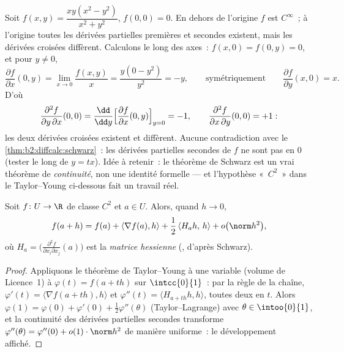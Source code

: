 \begin{example}\label{ex:b2:diffcalc:peano}
Soit $f(x, y) = \dfrac{xy(x^2 - y^2)}{x^2 + y^2}$, $f(0,0) = 0$.
En dehors de l'origine $f$ est $C^\infty$~; à l'origine toutes les
dérivées partielles premières et secondes existent, mais les dérivées
croisées diffèrent. Calculons le long des axes~: $f(x, 0) = f(0, y) =
0$, et pour $y \neq 0$,
\[
\frac{\partial f}{\partial x}(0, y)
= \lim_{x\to0}\frac{f(x,y)}{x}
= \frac{y(0 - y^2)}{y^2} = -y ,
\qquad\text{symétriquement}\qquad
\frac{\partial f}{\partial y}(x, 0) = x .
\]
D'où
\[
\frac{\partial^2 f}{\partial y\,\partial x}(0,0)
= \frac{\dd}{\dd y}\Bigl[\frac{\partial f}{\partial
x}(0,y)\Bigr]_{y=0} = -1,
\qquad
\frac{\partial^2 f}{\partial x\,\partial y}(0,0) = +1 :
\]
les deux dérivées croisées existent et diffèrent. Aucune
contradiction avec le \cref{thm:b2:diffcalc:schwarz}~: les dérivées
partielles secondes de $f$ ne sont pas  en $0$ (tester le
long de $y = tx$). Idée à retenir~: le théorème de Schwarz est un
vrai théorème de \emph{continuité}, non une identité formelle --- et
l'hypothèse «~$C^2$~» dans le Taylor--Young ci-dessous fait un
travail réel.
\end{example}

\begin{theorem}\label{thm:b2:diffcalc:taylor}
Soit $f \colon U \to \R$ de classe $C^2$ et $a \in U$. Alors, quand
$h \to 0$,
\[
f(a + h) = f(a) + \langle\nabla f(a), h\rangle
+ \frac12\, \langle H_a h,\, h\rangle + o\bigl(\norm h^2\bigr),
\]
où $H_a = \bigl(\frac{\partial^2 f}{\partial x_i\partial
x_j}(a)\bigr)$ est la \emph{matrice hessienne}
(, d'après Schwarz).
\end{theorem}

\begin{proof}
Appliquons le théorème de Taylor--Young à une variable (volume de
Licence~1) à $\varphi(t) = f(a + th)$ sur $\intcc{0}{1}$~: par la
règle de la chaîne, $\varphi'(t) = \langle \nabla f(a + th),
h\rangle$ et $\varphi''(t) = \langle H_{a+th}h, h\rangle$, toutes
deux  en $t$. Alors $\varphi(1) = \varphi(0) + \varphi'(0)
+ \frac12\varphi''(\theta)$ (Taylor--Lagrange) avec $\theta \in
\intoo{0}{1}$, et la continuité des dérivées partielles secondes
transforme $\varphi''(\theta) = \varphi''(0) + o(1)\cdot\norm h^2$
de manière uniforme~: le développement affiché.
\end{proof}

